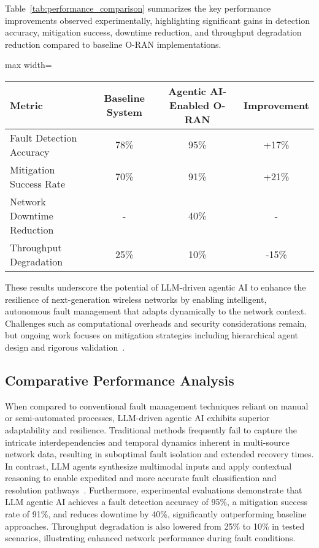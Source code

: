 \documentclass[sigconf]{acmart}
\begin{document}
Table~\ref{tab:performance_comparison} summarizes the key performance improvements observed experimentally, highlighting significant gains in detection accuracy, mitigation success, downtime reduction, and throughput degradation reduction compared to baseline O-RAN implementations.

\begin{table*}[htbp]
\centering
\caption{Performance Comparison of Agentic AI-Enabled O-RAN vs. Baseline Systems}
\label{tab:performance_comparison}
\begin{adjustbox}{max width=\textwidth}
\begin{tabular}{@{}lccc@{}}
\toprule
Metric & Baseline System & Agentic AI-Enabled O-RAN & Improvement \\
\midrule
Fault Detection Accuracy & 78\% & 95\% & +17\% \\
Mitigation Success Rate & 70\% & 91\% & +21\% \\
Network Downtime Reduction & - & 40\% & - \\
Throughput Degradation & 25\% & 10\% & -15\% \\
\bottomrule
\end{tabular}
\end{adjustbox}
\end{table*}

These results underscore the potential of LLM-driven agentic AI to enhance the resilience of next-generation wireless networks by enabling intelligent, autonomous fault management that adapts dynamically to the network context. Challenges such as computational overheads and security considerations remain, but ongoing work focuses on mitigation strategies including hierarchical agent design and rigorous validation~\cite{ref55}.

\subsection{Comparative Performance Analysis}

When compared to conventional fault management techniques reliant on manual or semi-automated processes, LLM-driven agentic AI exhibits superior adaptability and resilience. Traditional methods frequently fail to capture the intricate interdependencies and temporal dynamics inherent in multi-source network data, resulting in suboptimal fault isolation and extended recovery times. In contrast, LLM agents synthesize multimodal inputs and apply contextual reasoning to enable expedited and more accurate fault classification and resolution pathways~\cite{ref55}. Furthermore, experimental evaluations demonstrate that LLM agentic AI achieves a fault detection accuracy of 95\%, a mitigation success rate of 91\%, and reduces downtime by 40\%, significantly outperforming baseline approaches. Throughput degradation is also lowered from 25\% to 10\% in tested scenarios, illustrating enhanced network performance during fault conditions. 
\end{document}
